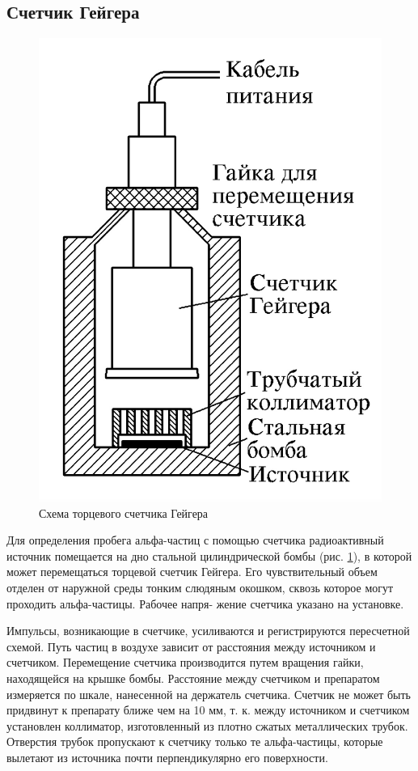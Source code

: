 \documentclass[12pt]{kiarticle} %
\begin{document}
	\subsection{Счетчик Гейгера}
	
	\begin{figure}
		\includegraphics[width=\linewidth]{Geyger}
		\caption{Схема торцевого счетчика Гейгера}
		\label{ris geyger}
	\end{figure}
	
	Для определения пробега альфа-частиц с помощью счетчика радиоактивный источник помещается на дно стальной цилиндрической бомбы
	(рис. \ref{ris geyger}), в которой может перемещаться торцевой счетчик Гейгера. Его
	чувствительный объем отделен от наружной среды тонким слюдяным
	окошком, сквозь которое могут проходить альфа-частицы. Рабочее напря-
	жение счетчика указано на установке.
	
	Импульсы, возникающие в счетчике, усиливаются и регистрируются пересчетной схемой. Путь частиц в воздухе зависит от расстояния между источником и счетчиком. Перемещение счетчика производится путем вращения гайки, находящейся на крышке бомбы. Расстояние
	между счетчиком и препаратом измеряется по шкале, нанесенной на
	держатель счетчика. Счетчик не может быть придвинут к препарату ближе чем на 10 мм, т. к. между источником и счетчиком установлен коллиматор, изготовленный из плотно сжатых металлических трубок. Отверстия трубок пропускают к счетчику только те альфа-частицы, которые вылетают из источника почти перпендикулярно его поверхности.
	
\end{document}
